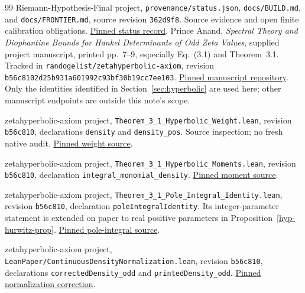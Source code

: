 \documentclass[11pt,a4paper]{article}
\numberwithin{equation}{section}
\theoremstyle{definition}
\theoremstyle{remark}
\begin{document}
\begin{thebibliography}{99}
Riemann-Hypothesis-Final project, \texttt{provenance/status.json},
\texttt{docs/BUILD.md}, and \texttt{docs/FRONTIER.md},
source revision \texttt{362d9f8}. Source evidence and open finite
calibration obligations.
\href{https://github.com/randogelist/Riemann-Hypothesis-Final/blob/362d9f8aeaaf9479cc27ceb6b63bdb7456267990/provenance/status.json}{Pinned status record}.
Prince Anand, \emph{Spectral Theory and Diophantine Bounds for Hankel
Determinants of Odd Zeta Values}, supplied project manuscript,
printed pp.~7--9, especially Eq.~(3.1) and Theorem~3.1.
Tracked in \texttt{randogelist/zetahyperbolic-axiom}, revision
\texttt{b56c8102d25b931a601992c93bf30b19cc7ee103}.
\href{https://github.com/randogelist/zetahyperbolic-axiom/tree/b56c8102d25b931a601992c93bf30b19cc7ee103}{Pinned manuscript repository}.
Only the identities identified in Section~\ref{sec:hyperbolic} are
used here; other manuscript endpoints are outside this note's scope.

zetahyperbolic-axiom project,
\texttt{Theorem\_3\_1\_Hyperbolic\_Weight.lean},
revision \texttt{b56c810}, declarations \texttt{density} and
\texttt{density\_pos}. Source inspection; no fresh native audit.
\href{https://github.com/randogelist/zetahyperbolic-axiom/blob/b56c8102d25b931a601992c93bf30b19cc7ee103/src/Theorem_3_1_Hyperbolic_Weight.lean}{Pinned weight source}.

zetahyperbolic-axiom project,
\texttt{Theorem\_3\_1\_Hyperbolic\_Moments.lean},
revision \texttt{b56c810}, declaration
\texttt{integral\_monomial\_density}.
\href{https://github.com/randogelist/zetahyperbolic-axiom/blob/b56c8102d25b931a601992c93bf30b19cc7ee103/src/Theorem_3_1_Hyperbolic_Moments.lean}{Pinned moment source}.

zetahyperbolic-axiom project,
\texttt{Theorem\_3\_1\_Pole\_Integral\_Identity.lean},
revision \texttt{b56c810}, declaration \texttt{poleIntegralIdentity}.
Its integer-parameter statement is extended on paper to real positive
parameters in Proposition~\ref{hyp-hurwitz-prop}.
\href{https://github.com/randogelist/zetahyperbolic-axiom/blob/b56c8102d25b931a601992c93bf30b19cc7ee103/src/Theorem_3_1_Pole_Integral_Identity.lean}{Pinned pole-integral source}.

zetahyperbolic-axiom project,
\texttt{LeanPaper/ContinuousDensityNormalization.lean},
revision \texttt{b56c810}, declarations
\texttt{correctedDensity\_odd} and \texttt{printedDensity\_odd}.
\href{https://github.com/randogelist/zetahyperbolic-axiom/blob/b56c8102d25b931a601992c93bf30b19cc7ee103/src/LeanPaper/ContinuousDensityNormalization.lean}{Pinned normalization correction}.


\end{thebibliography}
\end{document}
